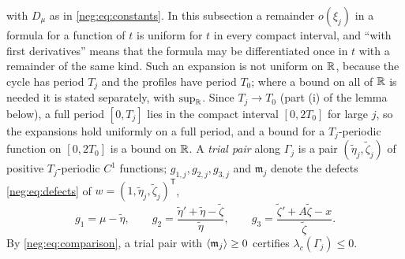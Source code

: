 with $D_\mu$ as in \eqref{neg:eq:constants}. In this subsection a remainder $o(\xi_j)$ in a formula for a function of $t$ is uniform for $t$ in every compact interval, and ``with first derivatives'' means that the formula may be differentiated once in $t$ with a remainder of the same kind. Such an expansion is not uniform on $\mathbb R$, because the cycle has period $T_j$ and the profiles have period $T_0$; where a bound on all of $\mathbb R$ is needed it is stated separately, with $\sup_\mathbb R$. Since $T_j\to T_0$ (part (i) of the lemma below), a full period $[0,T_j]$ lies in the compact interval $[0,2T_0]$ for large $j$, so the expansions hold uniformly on a full period, and a bound for a $T_j$-periodic function on $[0,2T_0]$ is a bound on $\mathbb R$. A \emph{trial pair} along $\Gamma_j$ is a pair $(\tilde\eta_j,\tilde\zeta_j)$ of positive $T_j$-periodic $C^1$ functions; $g_{1,j},g_{2,j},g_{3,j}$ and $\mathfrak m_j$ denote the defects \eqref{neg:eq:defects} of $w=(1,\tilde\eta_j,\tilde\zeta_j)^{\mathsf T}$,
\[
g_1=\mu-\tilde\eta,\qquad g_2=\frac{\tilde\eta'+\tilde\eta-\tilde\zeta}{\tilde\eta},\qquad g_3=\frac{\tilde\zeta'+A\tilde\zeta-x}{\tilde\zeta}.
\]
By \eqref{neg:eq:comparison}, a trial pair with $\left\langle \mathfrak m_j\right\rangle\ge0$ certifies $\lambda_c(\Gamma_j)\le0$.

